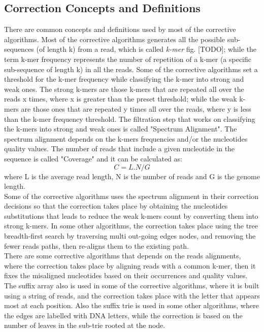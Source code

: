 \documentclass{llncs}
\begin{document}
\subsection{Correction Concepts and Definitions}
There are common concepts and definitions used by most of the corrective algorithms. Most of the corrective algorithms generates all the possible sub-sequences (of length k) from a read, which is called \textit{k-mer} fig. [TODO]; while the term k-mer frequency represents the number of repetition of a k-mer (a specific sub-sequence of length k) in all the reads. Some of the corrective algorithms set a threshold for the k-mer frequency while classifying the k-mer into strong and weak ones. The strong k-mers are those k-mers that are repeated all over the reads x times, where x is greater than the preset threshold; while the weak k-mers are those ones that are repeated y times all over the reads, where y is less than the k-mer frequency threshold. The filtration step that works on classifying the k-mers into strong and weak ones is called "Spectrum Alignment". The spectrum alignment depends on the k-mers frequencies and/or the nucleotides quality values. 
The number of reads that include a given nucleotide in the sequence is called "Coverage" and it can be calculated as:
\[ C = L.N/G \]
where L is the average read length, N is the number of reads and G is the genome length.
\\
Some of the corrective algorithms uses the spectrum alignment in their correction decisions so that the correction takes place by obtaining the nucleotides substitutions that leads to reduce the weak k-mers count by converting them into strong k-mers.
In some other algorithms, the correction takes place using the tree breadth-first search by traversing multi out-going edges nodes, and removing the fewer reads paths, then re-aligns them to the existing path.
\\
There are some corrective algorithms that depends on the reads alignments, where the correction takes place by aligning reads with a common k-mer, then it fixes the misaligned nucleotides based on their occurrences and quality values.
The suffix array also is used in some of the corrective algorithms, where it is built using a string of reads, and the correction takes place with the letter that appears most at each position. Also the suffix trie is used in some other algorithms, where the edges are labelled with DNA letters, while the correction is based on the number of leaves in the sub-trie rooted at the node.
\\
\end{document}

